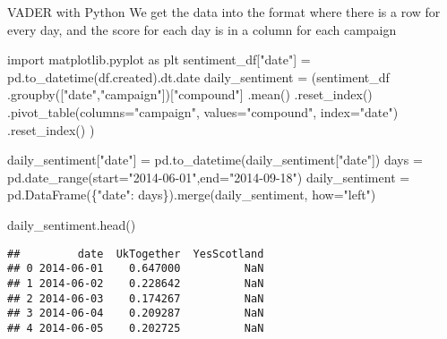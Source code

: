 \documentclass[
  10pt,
  ignorenonframetext,
  aspectratio=169]{beamer}
\newenvironment{Shaded}{\begin{snugshade}}{\end{snugshade}}
\newcommand{\ImportTok}[1]{\textcolor[rgb]{0.80,0.80,0.80}{#1}}
\newcommand{\NormalTok}[1]{\textcolor[rgb]{0.80,0.80,0.80}{#1}}
\newcommand{\OperatorTok}[1]{\textcolor[rgb]{0.94,0.94,0.82}{#1}}
\newcommand{\StringTok}[1]{\textcolor[rgb]{0.80,0.58,0.58}{#1}}
\begin{document}
\begin{frame}[fragile]{VADER with Python}
\protect\hypertarget{vader-with-python-1}{}
We get the data into the format where there is a row for every day, and
the score for each day is in a column for each campaign

\medskip
\scriptsize

\begin{Shaded}
\begin{Highlighting}[]
\ImportTok{import}\NormalTok{ matplotlib.pyplot }\ImportTok{as}\NormalTok{ plt}
\NormalTok{sentiment\_df[}\StringTok{"date"}\NormalTok{] }\OperatorTok{=}\NormalTok{ pd.to\_datetime(df.created).dt.date}
\NormalTok{daily\_sentiment }\OperatorTok{=}\NormalTok{ (sentiment\_df}
\NormalTok{                   .groupby([}\StringTok{"date"}\NormalTok{,}\StringTok{"campaign"}\NormalTok{])[}\StringTok{"compound"}\NormalTok{]}
\NormalTok{                   .mean()}
\NormalTok{                   .reset\_index()}
\NormalTok{                   .pivot\_table(columns}\OperatorTok{=}\StringTok{"campaign"}\NormalTok{, values}\OperatorTok{=}\StringTok{"compound"}\NormalTok{, index}\OperatorTok{=}\StringTok{"date"}\NormalTok{)}
\NormalTok{                   .reset\_index()}
\NormalTok{                  )}

\NormalTok{daily\_sentiment[}\StringTok{"date"}\NormalTok{] }\OperatorTok{=}\NormalTok{ pd.to\_datetime(daily\_sentiment[}\StringTok{"date"}\NormalTok{])}
\NormalTok{days }\OperatorTok{=}\NormalTok{ pd.date\_range(start}\OperatorTok{=}\StringTok{"2014{-}06{-}01"}\NormalTok{,end}\OperatorTok{=}\StringTok{"2014{-}09{-}18"}\NormalTok{)}
\NormalTok{daily\_sentiment }\OperatorTok{=}\NormalTok{ pd.DataFrame(\{}\StringTok{"date"}\NormalTok{: days\}).merge(daily\_sentiment, how}\OperatorTok{=}\StringTok{"left"}\NormalTok{)}

\NormalTok{daily\_sentiment.head()}
\end{Highlighting}
\end{Shaded}

\begin{verbatim}
##         date  UkTogether  YesScotland
## 0 2014-06-01    0.647000          NaN
## 1 2014-06-02    0.228642          NaN
## 2 2014-06-03    0.174267          NaN
## 3 2014-06-04    0.209287          NaN
## 4 2014-06-05    0.202725          NaN
\end{verbatim}
\end{frame}
\end{document}
